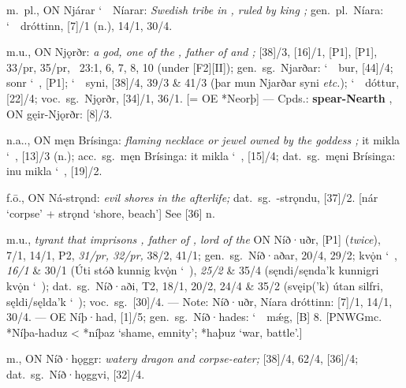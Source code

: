 \begin{itemize}
 m.~pl., ON Njárar \char`~\ Níarar:
  \emph{Swedish tribe in , ruled by king ;} gen.~pl.~Níara: \char`~\ dróttinn, [7]/1 (n.), 14/1, 30/4.

 m.u., ON Njǫrðr:
  \emph{a god, one of the , father of  and ;} %
  [38]/3, [16]/1, [P1], [P1], 33/pr, 35/pr, \Gylfaginning~23:1, 6, 7, 8, 10 (under [F2][II]); %
  gen.~sg.~Njarðar: \char`~\ bur, [44]/4; %
  sonr \char`~, [P1]; %
  \char`~\ syni, [38]/4, 39/3 \& 41/3 (þar mun Njarðar syni \emph{etc.}); %
  \char`~\ dóttur, [22]/4;
  voc.~sg.~Njǫrðr, [34]/1, 36/1.
  [= OE *Neorþ]
  --- Cpds.: \textbf{spear-Nearth} , ON gęir-Njǫrðr: [8]/3.

 n.a.., ON męn Brísinga:
  \emph{flaming necklace or jewel owned by the goddess ;}
  it mikla \char`~, [13]/3 (n.);
  acc.~sg.~męn Brísinga: it mikla \char`~, [15]/4;
  dat.~sg.~męni Brísinga: inu mikla \char`~, [19]/2.

 f.ō., ON Ná-strǫnd:
  \emph{evil shores in the afterlife;} dat.~sg.~-strǫndu, [37]/2.
  [nár ‘corpse’ + strǫnd ‘shore, beach’]
  See [36] n.

 m.u.,
  \emph{tyrant that imprisons , father of , lord of the }  ON Níð·uðr, [P1] (\emph{twice}), 7/1, 14/1, P2, \emph{31/pr, 32/pr,} 38/2, 41/1;
  gen.~sg.~Níð·aðar, 20/4, 29/2; kvǫ̇n \char`~, \emph{16/1} \& 30/1 (Úti stóð kunnig kvǫ̇n \char`~), \emph{25/2} \& 35/4 (sęndi/sęnda’k kunnigri kvǫ̇n \char`~);
  dat.~sg.~Níð·aði,  T2, 18/1, 20/2, 24/4 \& 35/2 (svęip(’k) útan silfri, sęldi/sęlda’k \char`~);
  voc.~sg.~[30]/4.
  --- Note: Níð·uðr, Níara dróttinn: [7]/1, 14/1, 30/4.
  --- OE Níþ·had, [1]/5; gen.~sg.~Níð·hades: \char`~\ mǽg, [B] 8.
  [PNWGmc. *Níþa-haduz < *níþaz ‘shame, emnity’; *haþuz ‘war, battle’.]

 m., ON Níð·hǫggr:
  \emph{watery dragon and corpse-eater;} [38]/4, 62/4, [36]/4; dat.~sg.~Níð·hǫggvi, [32]/4.


\end{itemize}
